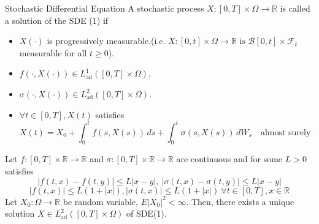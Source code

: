 \documentclass[final]{beamer}
\newcommand{\E}{E}
\newlength{\colwidth}
\begin{document}
\begin{frame}[t]
\begin{columns}[t]
\begin{column}{\colwidth}
\begin{block}{Stochastic Differential Equation}
    A stochastic process $X \colon [0,T] \times \Omega \rightarrow \mathbb{R}$ is called a solution of the SDE (1) if
    \begin{itemize}
        \item $X(\cdot)$ is progressively measurable.(i.e. $X \colon [0,t] \times \Omega \rightarrow \mathbb{R} \text{ is } \mathcal{B}[0,t]\times\mathcal{F}_t$ measurable for all $t \geq 0$).
        \item $f(\cdot,X(\cdot)) \in L_{\text{ad}}^1([0,T] \times \Omega)$.
        \item $\sigma(\cdot,X(\cdot)) \in L_{\text{ad}}^2([0,T] \times \Omega)$.
        \item $\forall t \in [0,T],X(t)$ satisfies
        \[X(t) = X_0 + \int_0^t f(s,X(s))\,ds + \int_0^t \sigma(s,X(s))\,dW_s \quad \text{almost surely in} \ P.\]
    \end{itemize}


    Let $f \colon [0,T] \times \mathbb{R} \rightarrow \mathbb{R}$ and $\sigma \colon [0,T] \times \mathbb{R} \rightarrow \mathbb{R}$ are continuous and for some $L > 0$ satisfies 
    \[ \left|f(t,x) - f(t,y)\right| \leq L\left|x-y\right|, \ \left|\sigma(t,x) - \sigma(t,y)\right| \leq L\left|x-y\right|\]
    \[ \left|f(t,x)\right| \leq L(1+\left|x\right|) ,\left|\sigma(t,x)\right| \leq L(1+\left|x\right|) \ \forall t \in [0,T], x \in \mathbb{R}\]
    Let $X_0 \colon \Omega \rightarrow \mathbb{R}$ be random variable, ${\E}\left|X_0\right|^2 < \infty $. Then, there exists a unique solution $X \in L^2_\text{ad}([0,T] \times \Omega)$ of SDE(1).


\end{block}
\end{column}
\end{columns}
\end{frame}
\end{document}
